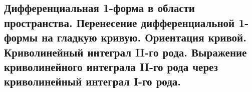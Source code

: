 \subsection{Дифференциальная 1-форма в области пространства. Перенесение дифференциальной 1-формы на гладкую кривую. Ориентация кривой. Криволинейный интеграл II-го рода. Выражение криволинейного интеграла II-го рода через криволинейный интеграл I-го рода.}